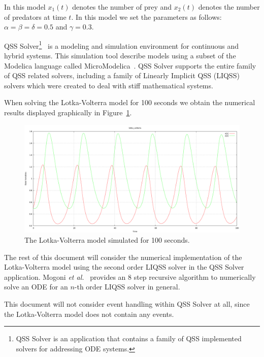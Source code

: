 \documentclass[10pt]{article}
\begin{document}
In this model $x_1(t)$ denotes the number of prey and $x_2(t)$ denotes the number of predators at time $t$. In this model we set the parameters as follows: $\alpha = \beta = \delta =0.5$ and $\gamma=0.3$.

QSS Solver\footnote{QSS Solver is an application that contains a family of QSS implemented solvers for addressing ODE systems.}~\cite{qss} is a modeling and simulation environment for continuous and hybrid systems. This simulation tool describe models using a subset of the Modelica language called MicroModelica~\cite{micro}. QSS Solver supports the entire family of QSS related solvers, including a family of Linearly Implicit QSS (LIQSS)~\cite{MigoniKofman2009} solvers which were created to deal with stiff mathematical systems.

When solving the Lotka-Volterra model for 100 seconds we obtain the numerical results displayed graphically in Figure~\ref{fig1}.

\begin{figure}[htbp]
\begin{center}
		\includegraphics[scale=0.25]{./Figures/Selection_116.png}

\end{center}
\vspace{-0.5cm}

\caption{The Lotka-Volterra model simulated for 100 seconds.}\label{fig1}
\end{figure}



The rest of this document will consider the numerical implementation of the Lotka-Volterra model using the second order LIQSS solver in the QSS Solver application. Mogoni {\em et al.}~\cite{MigoniBortolottoKofmanCellier2013} provides an 8 step recursive algorithm to numerically solve an ODE for an $n$-th order LIQSS solver in general.

This document will not consider event handling within QSS Solver at all, since the Lotka-Volterra model does not contain any events.
\end{document}
